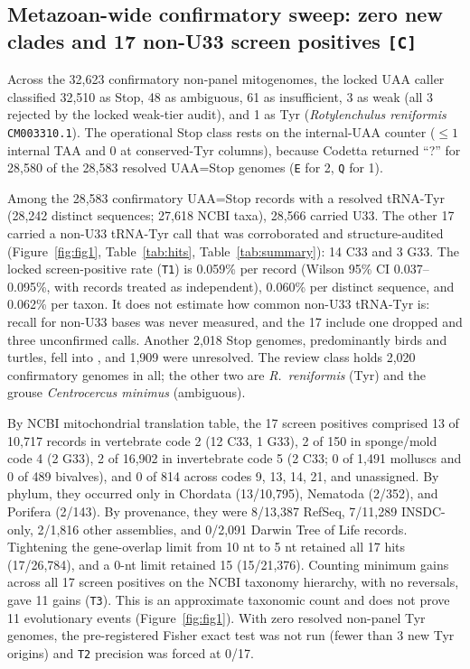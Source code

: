 \documentclass[11pt, a4paper]{article}
\begin{document}
\subsection{Metazoan-wide confirmatory sweep: zero new clades and 17 non-U33 screen positives \texttt{[C]}}
Across the 32,623 confirmatory non-panel mitogenomes, the locked UAA caller classified 32,510 as Stop, 48 as ambiguous, 61 as insufficient, 3 as weak (all 3 rejected by the locked weak-tier audit), and 1 as Tyr (\textit{Rotylenchulus reniformis} \texttt{CM003310.1}). The operational Stop class rests on the internal-UAA counter ($\le 1$ internal TAA and 0 at conserved-Tyr columns), because Codetta returned ``?'' for 28,580 of the 28,583 resolved UAA=Stop genomes (\texttt{E} for 2, \texttt{Q} for 1).

Among the 28,583 confirmatory UAA=Stop records with a resolved tRNA-Tyr (28,242 distinct sequences; 27,618 NCBI taxa), 28,566 carried U33. The other 17 carried a non-U33 tRNA-Tyr call that was corroborated and structure-audited (Figure~\ref{fig:fig1}, Table~\ref{tab:hits}, Table~\ref{tab:summary}): 14 C33 and 3 G33. The locked screen-positive rate (\texttt{T1}) is 0.059\% per record (Wilson 95\% CI 0.037--0.095\%, with records treated as independent), 0.060\% per distinct sequence, and 0.062\% per taxon. It does not estimate how common non-U33 tRNA-Tyr is: recall for non-U33 bases was never measured, and the 17 include one dropped and three unconfirmed calls. Another 2,018 Stop genomes, predominantly birds and turtles, fell into , and 1,909 were unresolved. The review class holds 2,020 confirmatory genomes in all; the other two are \textit{R.\ reniformis} (Tyr) and the grouse \textit{Centrocercus minimus} (ambiguous).

By NCBI mitochondrial translation table, the 17 screen positives comprised 13 of 10,717 records in vertebrate code 2 (12 C33, 1 G33), 2 of 150 in sponge/mold code 4 (2 G33), 2 of 16,902 in invertebrate code 5 (2 C33; 0 of 1,491 molluscs and 0 of 489 bivalves), and 0 of 814 across codes 9, 13, 14, 21, and unassigned. By phylum, they occurred only in Chordata (13/10,795), Nematoda (2/352), and Porifera (2/143). By provenance, they were 8/13,387 RefSeq, 7/11,289 INSDC-only, 2/1,816 other assemblies, and 0/2,091 Darwin Tree of Life records. Tightening the gene-overlap limit from 10 nt to 5 nt retained all 17 hits (17/26,784), and a 0-nt limit retained 15 (15/21,376). Counting minimum gains across all 17 screen positives on the NCBI taxonomy hierarchy, with no reversals, gave 11 gains (\texttt{T3}). This is an approximate taxonomic count and does not prove 11 evolutionary events (Figure~\ref{fig:fig1}). With zero resolved non-panel Tyr genomes, the pre-registered Fisher exact test was not run (fewer than 3 new Tyr origins) and \texttt{T2} precision was forced at 0/17.
\end{document}
